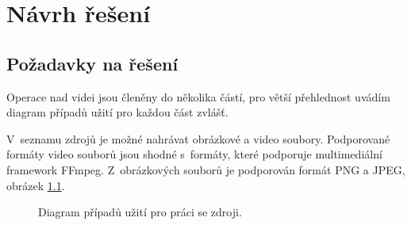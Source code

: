 \chapter{Návrh řešení}
\section{Požadavky na řešení}
Operace nad videi jsou členěny do několika částí, pro větší přehlednost uvádím diagram případů užití pro každou část zvlášť.

V~seznamu zdrojů je možné nahrávat obrázkové a video soubory. Podporované formáty video souborů jsou shodné s~formáty, které podporuje multimediální framework FFmpeg. Z~obrázkových souborů je podporován formát PNG a JPEG, obrázek \ref{img:ucd-zdroj}.
\begin{figure}[h]
	\centering
	\caption{Diagram případů užití pro práci se zdroji.}\label{img:ucd-zdroj}
\end{figure}

